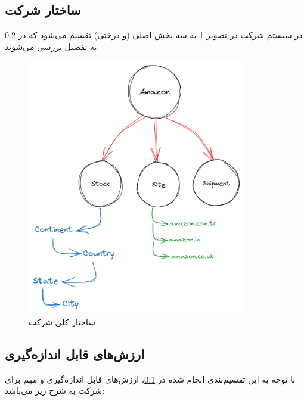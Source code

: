 \documentclass[12pt, dvipsnames, svgnames, x11names,]{article}
\begin{document}
\subsection{ساختار شرکت}\label{amz-struct}
در سیستم  شرکت  در تصویر \ref{amz-s3} به سه بخش اصلی (و درختی) تقسیم می‌شود که در \ref{intro-movs} به تفضیل بررسی می‌شوند.
\begin{figure}[b]
\begin{center}
    \includegraphics[width=0.85\textwidth, height=0.75\textheight]{../images/amazon-s3-comp(2)}
\end{center} 
\caption{ساختار کلی شرکت }\label{amz-s3}
\end{figure}

\subsection{ارزش‌های قابل‌ اندازه‌گیری}\label{intro-movs}
با توجه به این تقسیم‌بندی انجام شده در \ref{amz-struct}، ارزش‌های قابل‌ اندازه‌گیری \label{movs}
و مهم برای شرکت  به شرح زیر می‌باشد:
\end{document}
